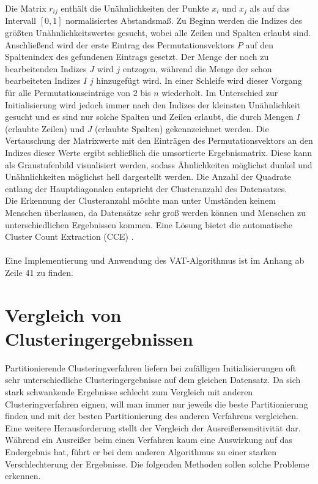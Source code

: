 \documentclass[11pt,ceqn]{book}
\begin{document}
Die Matrix $r_{ij}$ enthält die Unähnlichkeiten der Punkte $x_i$ und $x_j$ als auf das Intervall $\left[0,1\right]$ normalisiertes Abstandsmaß. Zu Beginn werden die Indizes des größten Unähnlichkeitswertes gesucht, wobei alle Zeilen und Spalten erlaubt sind. Anschließend wird der erste Eintrag des Permutationsvektors $P$ auf den Spaltenindex des gefundenen Eintrags gesetzt. Der Menge der noch zu bearbeitenden Indizes $J$ wird $j$ entzogen, während die Menge der schon bearbeiteten Indizes $I$ $j$ hinzugefügt wird. In einer Schleife wird dieser Vorgang für alle Permutationseinträge von $2$ bis $n$ wiederholt. Im Unterschied zur Initialisierung wird jedoch immer nach den Indizes der kleinsten Unähnlichkeit gesucht und es sind nur solche Spalten und Zeilen erlaubt, die durch Mengen $I$ (erlaubte Zeilen) und $J$ (erlaubte Spalten) gekennzeichnet werden. Die Vertauschung der Matrixwerte mit den Einträgen des Permutationsvektors an den Indizes dieser Werte ergibt schließlich die umsortierte Ergebnismatrix. Diese kann als Graustufenbild visualisiert werden, sodass Ähnlichkeiten möglichst dunkel und Unähnlichkeiten möglichst hell dargestellt werden. Die Anzahl der Quadrate entlang der Hauptdiagonalen entspricht der Clusteranzahl des Datensatzes.
\\
Die Erkennung der Clusteranzahl möchte man unter Umständen keinem Menschen überlassen, da Datensätze sehr groß werden können und Menschen zu unterschiedlichen Ergebnissen kommen. Eine Lösung bietet die automatische Cluster Count Extraction (CCE) \cite{cce}.
\\~\\
Eine Implementierung und Anwendung des VAT-Algorithmus ist im Anhang ab Zeile 41 zu finden.

\section{Vergleich von Clusteringergebnissen}
Partitionierende Clusteringverfahren liefern bei zufälligen Initialisierungen oft sehr unterschiedliche Clusteringergebnisse auf dem gleichen Datensatz. Da sich stark schwankende Ergebnisse schlecht zum Vergleich mit anderen Clusteringverfahren eignen, will man immer nur jeweils die beste Partitionierung finden und mit der besten Partitionierung des anderen Verfahrens vergleichen. Eine weitere Herausforderung stellt der Vergleich der Ausreißersensitivität dar. Während ein Ausreißer beim einen Verfahren kaum eine Auswirkung auf das Endergebnis hat, führt er bei dem anderen Algorithmus zu einer starken Verschlechterung der Ergebnisse. Die folgenden Methoden sollen solche Probleme erkennen. 
\end{document}
